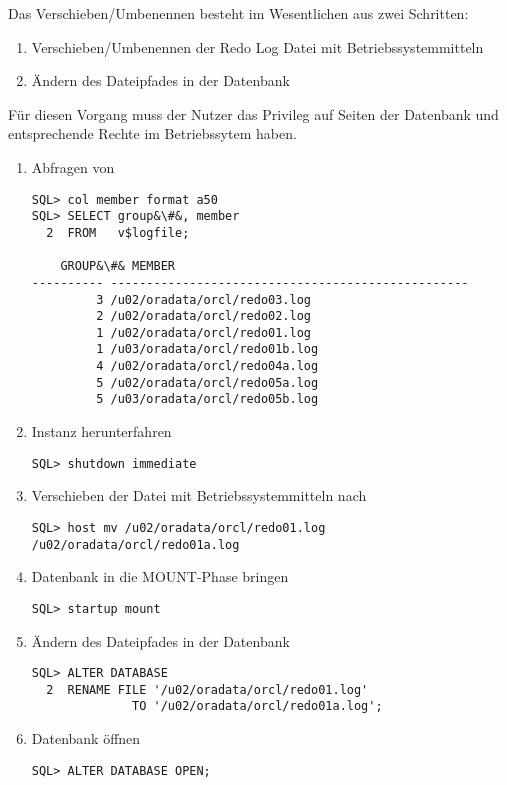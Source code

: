         Das Verschieben/Umbenennen besteht im Wesentlichen aus zwei Schritten:
        \begin{enumerate}
          \item Verschieben/Umbenennen der Redo Log Datei mit Betriebssystemmitteln
          \item \"Andern des Dateipfades in der Datenbank
        \end{enumerate}
        F\"ur diesen Vorgang muss der Nutzer das Privileg  auf Seiten der Datenbank und entsprechende Rechte im Betriebssytem haben.
        \begin{enumerate}
          \item Abfragen von 
            \begin{lstlisting}[caption={Speicherorte der Member ermitteln},label=admin35,language=oracle_sql,alsolanguage=sqlplus]
SQL> col member format a50
SQL> SELECT group&\#&, member
  2  FROM   v$logfile;

    GROUP&\#& MEMBER
---------- --------------------------------------------------
         3 /u02/oradata/orcl/redo03.log
         2 /u02/oradata/orcl/redo02.log
         1 /u02/oradata/orcl/redo01.log
         1 /u03/oradata/orcl/redo01b.log
         4 /u02/oradata/orcl/redo04a.log
         5 /u02/oradata/orcl/redo05a.log
         5 /u03/oradata/orcl/redo05b.log
             \end{lstlisting}
          \item Instanz herunterfahren
            \begin{lstlisting}[caption={Instanz herunterfahren},label=admin36,language=sqlplus]
SQL> shutdown immediate
            \end{lstlisting}
          \item Verschieben der Datei  mit Betriebssystemmitteln nach 
            \begin{lstlisting}[caption={Verschieben der Redo Log Datei mit BS Mitteln},label=admin36a,language=sqlplus]
SQL> host mv /u02/oradata/orcl/redo01.log /u02/oradata/orcl/redo01a.log
            \end{lstlisting}
          \item Datenbank in die MOUNT-Phase bringen
            \begin{lstlisting}[caption={Datenbank MOUNTen},label=admin37,language=sqlplus]
SQL> startup mount
            \end{lstlisting}
          \item \"Andern des Dateipfades in der Datenbank
                  \begin{lstlisting}[caption={Redo Log Datei umbenennen},label=admin38,language=oracle_sql]
SQL> ALTER DATABASE
  2  RENAME FILE '/u02/oradata/orcl/redo01.log'
              TO '/u02/oradata/orcl/redo01a.log';
            \end{lstlisting}
          \item Datenbank \"offnen
            \begin{lstlisting}[caption={Datenbank \"offnen},label=admin39,language=oracle_sql]
SQL> ALTER DATABASE OPEN;
            \end{lstlisting}
        \end{enumerate}
